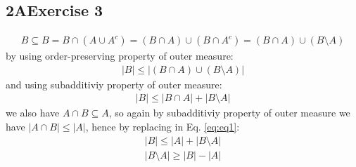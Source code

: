 \documentclass[12pt, letterpaper]{article}
\begin{document}
\subsection*{2\hspace{1pt}A\hspace{20pt}Exercise 3 }

\begin{align*}
    B\subseteq B=B\cap(A\cup A^c)=(B\cap A)\cup(B\cap A^c)=(B\cap A)\cup(B\setminus A)
\end{align*}
by using order-preserving property of outer measure:
\begin{align*}
    |B|\leq|(B\cap A)\cup(B\setminus A)|  
\end{align*}
and using subadditiviy property of outer measure:
\begin{align}
    |B|\leq|B\cap A|+|B\setminus A| 
    \label{eq:eq1}
\end{align}
we also have $A\cap B\subseteq A$, so again by subadditiviy property of outer measure we have $|A\cap B|\leq |A|$, hence by replacing in Eq. \ref{eq:eq1}:
\begin{align*}
    |B|\leq|A|+|B\setminus A| \\
    |B\setminus A|\geq |B|-|A|
\end{align*}

\clearpage
\end{document}
